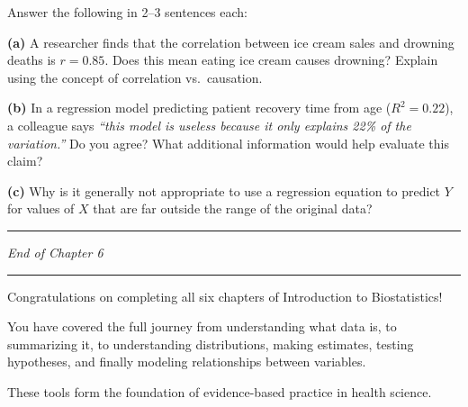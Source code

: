 \documentclass[
  12pt,
  letterpaper,
]{book}
\begin{document}
\begin{tcolorbox}[enhanced jigsaw, arc=.35mm, bottomrule=.15mm, bottomtitle=1mm, breakable, colback=white, colbacktitle=quarto-callout-caution-color!10!white, colframe=quarto-callout-caution-color-frame, coltitle=black, left=2mm, leftrule=.75mm, opacityback=0, opacitybacktitle=0.6, rightrule=.15mm, title={✏️ Exercise 3 --- Reflection Questions}, titlerule=0mm, toprule=.15mm, toptitle=1mm]

Answer the following in 2--3 sentences each:

\textbf{(a)} A researcher finds that the correlation between ice cream
sales and drowning deaths is \(r = 0.85\). Does this mean eating ice
cream causes drowning? Explain using the concept of correlation
vs.~causation.

\textbf{(b)} In a regression model predicting patient recovery time from
age (\(R^2 = 0.22\)), a colleague says \emph{``this model is useless
because it only explains 22\% of the variation.''} Do you agree? What
additional information would help evaluate this claim?

\textbf{(c)} Why is it generally not appropriate to use a regression
equation to predict \(Y\) for values of \(X\) that are far outside the
range of the original data?

\end{tcolorbox}

\begin{center}\rule{0.5\linewidth}{0.5pt}\end{center}

\emph{End of Chapter 6}

\begin{center}\rule{0.5\linewidth}{0.5pt}\end{center}

\begin{tcolorbox}[enhanced jigsaw, arc=.35mm, bottomrule=.15mm, bottomtitle=1mm, breakable, colback=white, colbacktitle=quarto-callout-note-color!10!white, colframe=quarto-callout-note-color-frame, coltitle=black, left=2mm, leftrule=.75mm, opacityback=0, opacitybacktitle=0.6, rightrule=.15mm, title={🎓 End of Course}, titlerule=0mm, toprule=.15mm, toptitle=1mm]

Congratulations on completing all six chapters of Introduction to
Biostatistics!

You have covered the full journey from understanding what data is, to
summarizing it, to understanding distributions, making estimates,
testing hypotheses, and finally modeling relationships between
variables.

These tools form the foundation of evidence-based practice in health
science.

\end{tcolorbox}


\backmatter
\end{document}
